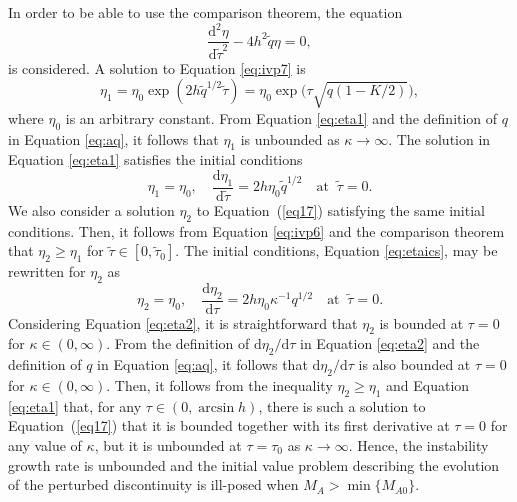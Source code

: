 \documentclass[12pt]{ociamthesis}
\begin{document}
In order to be able to use the comparison theorem, the equation
%
\begin{equation}
\label{eq:ivp7}
\frac{\mathrm{d}^2 \eta}{\mathrm{d}\tilde{\tau}^2} - 4h^2\tilde{q}\eta = 0, 
\end{equation}
%
is considered.
A solution to Equation \eqref{eq:ivp7} is
%
\begin{equation}
\label{eq:eta1}
\eta_1 = \eta_0\exp(2h\tilde{q}^{1/2}\tilde\tau) = 
\eta_0\exp\big(\tau\sqrt{q(1 - K/2)}\big),
\end{equation}
%
where $\eta_0$ is an arbitrary constant.
From Equation \eqref{eq:eta1} and the definition of $q$ in Equation \eqref{eq:aq}, it follows that $\eta_1$ is unbounded as $\kappa \to \infty$.
The solution in Equation \eqref{eq:eta1} satisfies the initial conditions
%
\begin{equation}
\label{eq:etaics}
\eta_1 = \eta_0, \quad \frac{\mathrm{d}\eta_1}{\mathrm{d}\tilde{\tau}} =
2h\eta_0\tilde{q}^{1/2} \quad \mbox{at} \;\; \tilde{\tau} = 0.
\end{equation}
%
We also consider a solution $\eta_2$ to Equation~(\ref{eq17}) satisfying the same initial conditions.
Then, it follows from Equation \eqref{eq:ivp6} and the comparison theorem that $\eta_2 \geq \eta_1$ for $\tilde{\tau} \in [0,\tilde{\tau}_0]$.
The initial conditions, Equation \eqref{eq:etaics}, may be rewritten for $\eta_2$ as
%
\begin{equation}
\label{eq:eta2}
\eta_2 = \eta_0, \quad \frac{\mathrm{d}\eta_2}{\mathrm{d}\tau} =
2h\eta_0\kappa^{-1} q^{1/2} \quad \mbox{at} \;\; \tilde{\tau} = 0.
\end{equation}
%
Considering Equation \eqref{eq:eta2}, it is straightforward that $\eta_2$ is bounded at $\tau = 0$ for $\kappa \in (0,\infty)$.
From the definition of $\mathrm{d}\eta_2/\mathrm{d}\tau$ in Equation \eqref{eq:eta2} and the definition of $q$ in Equation \eqref{eq:aq}, it follows that $\mathrm{d}\eta_2/\mathrm{d}\tau$ is also bounded at $\tau = 0$ for $\kappa \in (0,\infty)$.
Then, it follows from the inequality $\eta_2 \geq \eta_1$ and Equation \eqref{eq:eta1} that, for any $\tau \in (0,\arcsin h)$, there is such a solution to Equation~(\ref{eq17}) that it is bounded together with its first derivative at $\tau = 0$ for any value of $\kappa$\/, but it is unbounded at $\tau = \tau_0$ as $\kappa \to \infty$.
Hence, the instability growth rate is unbounded and the initial value problem describing the evolution of the perturbed discontinuity is ill-posed when $M_A > \min \{ M_{A0} \}$.
\end{document}
